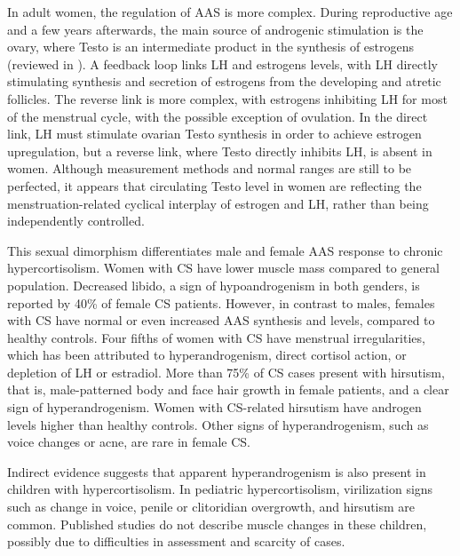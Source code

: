 \documentclass[12pt,english]{report}\usepackage[]{graphicx}\usepackage[]{color}
\begin{document}
In adult women, the regulation of AAS is more complex. During reproductive
age and a few years afterwards, the main source of androgenic stimulation
is the ovary\citep{judd1974endocrine}, where Testo is an intermediate
product in the synthesis of estrogens (reviewed in \citep{burger2002androgen}).
A feedback loop links LH and estrogens levels, with LH directly stimulating
synthesis and secretion of estrogens from the developing and atretic
follicles\citep{miller2001androgen}. The reverse link is more complex,
with estrogens inhibiting LH for most of the menstrual cycle\citep{yen1971effect},
with the possible exception of ovulation. In the direct link, LH must
stimulate ovarian Testo synthesis in order to achieve estrogen upregulation,
but a reverse link, where Testo directly inhibits LH, is absent in
women\citep{couzinet1989effects,abdel-rahman2014androgen}. Although
measurement methods and normal ranges are still to be perfected, it
appears that circulating Testo level in women are reflecting the menstruation-related
cyclical interplay of estrogen and LH, rather than being independently
controlled\citep{salonia2008menstrual,guerrero1976studies}.

This sexual dimorphism differentiates male and female AAS response
to chronic hypercortisolism. Women with CS have lower muscle mass
compared to general population\citep{wajchenberg1995estimation}.
Decreased libido, a sign of hypoandrogenism in both genders, is reported
by 40\% of female CS patients\citep{valassi2011european}. However,
in contrast to males, females with CS have normal or even increased
AAS synthesis and levels, compared to healthy controls\citep{vierhapper2000production,luisi1978plasma}.
Four fifths of women with CS have menstrual irregularities, which
has been attributed to hyperandrogenism, direct cortisol action, or
depletion of LH or estradiol\citep{lado-abeal1998menstrual}. More
than 75\% of CS cases present with hirsutism, that is, male-patterned
body and face hair growth in female patients, and a clear sign of
hyperandrogenism\citep{newell-price2006cushings,valassi2011european}.
Women with CS-related hirsutism have androgen levels higher than healthy
controls\citep{smals1977plasma}. Other signs of hyperandrogenism,
such as voice changes or acne, are rare in female CS.

Indirect evidence suggests that apparent hyperandrogenism is also
present in children with hypercortisolism. In pediatric hypercortisolism,
virilization signs such as change in voice, penile or clitoridian
overgrowth, and hirsutism are common\citep{joshi2005cushings,kanter2005single-center}.
Published studies do not describe muscle changes in these children,
possibly due to difficulties in assessment and scarcity of cases.
\end{document}
